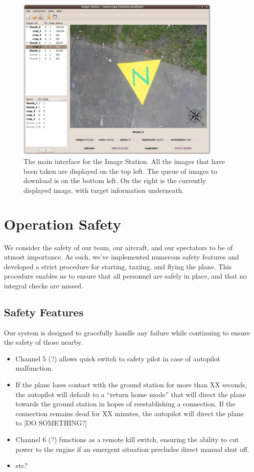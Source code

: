 \documentclass[10pt]{report}
\begin{document}
\begin{figure} [h]
  \centering
  	\includegraphics[width=0.9\textwidth]{../images/ImageStationMain.jpg}
  	\caption[Image Station Interface]{The main interface for the Image Station.  All the images that have been taken are displayed on the top left.  The queue of images to download is on the bottom left.  On the right is the currently displayed image, with target information underneath.}
  	\label{fig:imagestationinterface}
\end{figure}

\section{Operation Safety}

We consider the safety of our team, our aircraft, and our spectators to be of utmost importance.  As such, we've implemented numerous safety features and developed a strict procedure for starting, taxiing, and flying the plane.  This procedure enables us to ensure that all personnel are safely in place, and that no integral checks are missed.

\subsection{Safety Features}
Our system is designed to gracefully handle any failure while continuing to ensure the safety of those nearby. 
\begin{itemize}
	\setlength{\itemsep}{0cm}
	\setlength{\parskip}{0cm}
	\item Channel 5 (?) allows quick switch to safety pilot in case of autopilot malfunction.
	\item If the plane loses contact with the ground station for more than XX seconds, the autopilot will default to a ``return home mode'' that will direct the plane towards the ground station in hopes of reestablishing a connection.  If the connection remains dead for XX minutes, the autopilot will direct the plane to [DO SOMETHING?]
	\item Channel 6 (?) functions as a remote kill switch, ensuring the ability to cut power to the engine if an emergent situation precludes direct manual shut off.
	\item etc?
\end{itemize}
\end{document}

